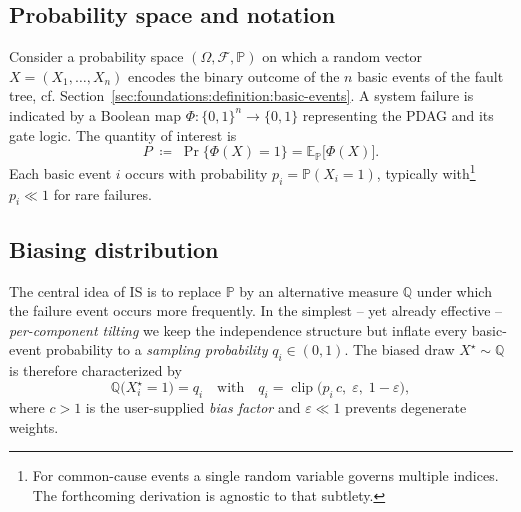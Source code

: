 \subsection{Probability space and notation}
Consider a probability space \((\Omega,\mathcal{F},\mathbb{P})\) on which a
random vector \(X=(X_{1},\dots,X_{n})\) encodes the binary outcome of the
\(n\) basic events of the fault tree, cf.
Section~\ref{sec:foundations:definition:basic-events}.  A system failure is
indicated by a Boolean map \(\Phi:\{0,1\}^{n}\to\{0,1\}\) representing the
PDAG and its gate logic.  The quantity of interest is
\begin{equation}
  P\;\coloneqq\;\Pr\bigl\{\Phi(X)=1\bigr\}=\mathbb{E}_{\mathbb{P}}\bigl[\Phi(X)\bigr].
  \label{eq:is:true-prob}
\end{equation}
Each basic event \(i\) occurs with probability
\(p_{i}=\mathbb{P}(X_{i}=1)\), typically with\footnote{For common-cause events
a single random variable governs multiple indices.  The forthcoming derivation
is agnostic to that subtlety.}
\(p_{i}\ll1\) for rare failures.

\subsection{Biasing distribution}
The central idea of IS is to replace \(\mathbb{P}\) by an alternative measure
\(\mathbb{Q}\) under which the failure event occurs more frequently.  In the
simplest – yet already effective – \emph{per-component tilting} we keep the
independence structure but inflate every basic-event probability to a
\emph{sampling probability} \(q_{i}\in(0,1)\).  The biased draw
\(X^{\star}\sim\mathbb{Q}\) is therefore characterized by
\begin{equation}
  \mathbb{Q}\bigl(X^{\star}_{i}=1\bigr)=q_{i}
  \quad\text{with}\quad
  q_{i}=\operatorname{clip}\bigl(p_{i}\,c,\;\varepsilon,\;1-\varepsilon\bigr),
  \label{eq:is:tilt}
\end{equation}
where \(c>1\) is the user-supplied \emph{bias factor} and
\(\varepsilon\ll1\) prevents degenerate weights.

